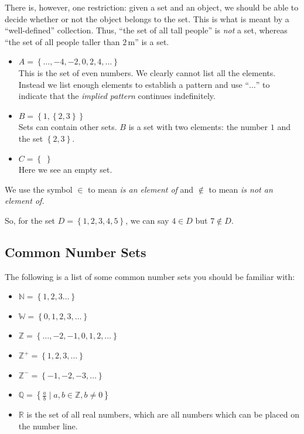 \documentclass[11pt,a4paper]{book}
\newcommand{\R}{\mathbb{R}}
\newcommand{\N}{\mathbb{N}}
\newcommand{\Z}{\mathbb{Z}}
\newcommand{\Q}{\mathbb{Q}}
\newcommand{\W}{\mathbb{W}}
\begin{document}
There is, however, one restriction: given a set and an object, we should be able to decide whether or not the object belongs to the set. This is what is meant by a “well-defined” collection. Thus, “the set of all tall people” is \textit{not} a set, whereas “the set of all people taller than $2\,\text{m}$” is a set.

\begin{itemize}
\setlength\itemsep{0em}

\item  $A=\left\{\ldots,-4,-2,0,2,4,\ldots\right\} $\\
This is the set of even numbers. We clearly cannot list all the elements.
Instead we list enough elements to establish a pattern and use ``$\ldots$'' to indicate that the \textit{implied pattern} continues indefinitely. 

\item  $B=\left\{ 1,\left\{ 2,3\right\} \right\} $\\
Sets can contain other sets. $B$ is a set with two elements: the
number $1$ and the set $\left\{ 2,3\right\} $.

\item  $C=\left\{ \;\right\} $ \\
Here we see an empty set.

\end{itemize}

We use the symbol $\in$ to mean \textit{is an element of }and $\not\in$
to mean \textit{is not an element of.}

So, for the set $D=\left\{ 1,2,3,4,5\right\} $, we can say $4\in D$
but $7\not\in D$.


\subsection{Common Number Sets}

The following is a list of some common number sets you should be familiar
with:
\begin{itemize}
\item $\N=\left\{ 1,2,3\ldots\right\} $
\item $\W=\left\{ 0,1,2,3,\ldots\right\} $
\item $\Z=\left\{ \ldots,-2,-1,0,1,2,\ldots\right\} $
\item $\Z^{+}=\left\{ 1,2,3,\ldots\right\} $
\item $\Z^{-}=\left\{ -1,-2,-3,\ldots\right\} $
\item ${\displaystyle \Q=\left\{ \frac{a}{b}\mid a,b\in\Z,b\neq0\right\} }$
\item $\R$ is the set of all real numbers, which are all numbers which
can be placed on the number line.
\end{itemize}
\end{document}
